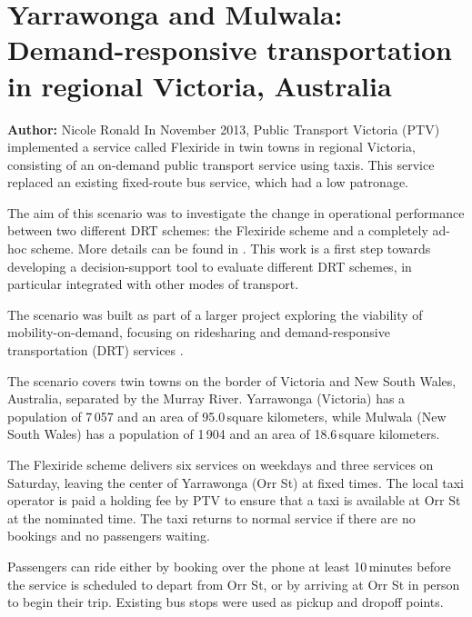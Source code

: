 \section{Yarrawonga and Mulwala: Demand-responsive transportation in regional Victoria, Australia}
\label{sec:yarrawonga}
\hfill \textbf{Author:} Nicole Ronald
In November 2013, Public Transport Victoria (PTV) implemented a service called
Flexiride in twin towns in regional Victoria, consisting of an on-demand public
transport service using taxis. This service replaced an existing fixed-route bus
service, which had a low patronage.

The aim of this scenario was to investigate the change in operational
performance between two different DRT schemes: the Flexiride scheme and a
completely ad-hoc scheme. More details can be found in
\citep[][]{RonThoWin2015}. This work is a first step towards developing a
decision-support tool to evaluate different DRT schemes, in particular
integrated with other modes of transport. 

The scenario was built as part of a larger project exploring the viability of
mobility-on-demand, focusing on ridesharing and demand-responsive transportation
(DRT) services \citep[][]{Ronald_iMoD_2014}.

The scenario covers twin towns on the border of Victoria and New South Wales,
Australia, separated by the Murray River. Yarrawonga (Victoria) has a population
of 7\,057 and an area of 95.0\,square kilometers, while Mulwala (New South Wales) has a
population of 1\,904 and an area of 18.6\,square kilometers. 

The Flexiride scheme delivers six services on weekdays and three services on
Saturday, leaving the center of Yarrawonga (Orr St) at fixed times.  The local
taxi operator is paid a holding fee by PTV to ensure that a taxi is available at
Orr St at the nominated time. The taxi returns to normal service if there are no
bookings and no passengers waiting.

Passengers can ride either by booking over the phone at least 10\,minutes before
the service is scheduled to depart from Orr St, or by arriving at Orr St in
person to begin their trip. Existing bus stops were used as pickup and dropoff
points.

